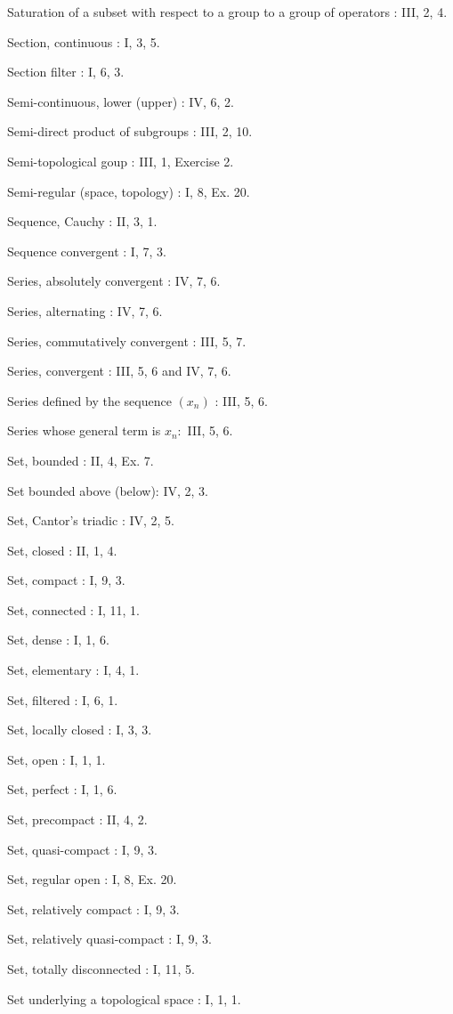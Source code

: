 Saturation of a subset with respect to a group to a group of operators : III, 2, 4.

Section, continuous : I, 3, 5.

Section filter : I, 6, 3.

Semi-continuous, lower (upper) : IV, 6, 2.

Semi-direct product of subgroups : III, 2, 10.

Semi-topological goup : III, 1, Exercise 2.

Semi-regular (space, topology) : I, 8, Ex. 20.

Sequence, Cauchy : II, 3, 1.

Sequence convergent : I, 7, 3.

Series, absolutely convergent : IV, 7, 6.

Series, alternating : IV, 7, 6.

Series, commutatively convergent : III, 5, 7.

Series, convergent : III, 5, 6 and IV, 7, 6.

Series defined by the sequence \((x_{n})\) : III, 5, 6.

Series whose general term is \(x_{n} :\) III, 5, 6.

Set, bounded : II, 4, Ex. 7.

Set bounded above (below): IV, 2, 3.

Set, Cantor's triadic : IV, 2, 5.

Set, closed : II, 1, 4.

Set, compact : I, 9, 3.

Set, connected : I, 11, 1.

Set, dense : I, 1, 6.

Set, elementary : I, 4, 1.

Set, filtered : I, 6, 1.

Set, locally closed : I, 3, 3.

Set, open : I, 1, 1.

Set, perfect : I, 1, 6.

Set, precompact : II, 4, 2.

Set, quasi-compact : I, 9, 3.

Set, regular open : I, 8, Ex. 20.

Set, relatively compact : I, 9, 3.

Set, relatively quasi-compact : I, 9, 3.

Set, totally disconnected : I, 11, 5.

Set underlying a topological space : I, 1, 1.


